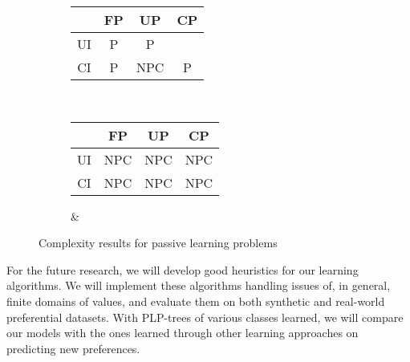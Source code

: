 \begin{figure}[!ht]
	\centering
  \begin{subfigure}[b]{0.25\textwidth}
		\centering
		\begin{tabular}[0.25\textwidth]{ | c | c | c | c | }
		  \hline
		     & FP & UP & CP \\
		  \hline
		  UI & P & P & \tit{NP}\\
		  \hline
		  CI & P & NPC & P  \\
		  \hline
		\end{tabular}
		\caption{}
		\label{fig:cons_learn}
	\end{subfigure}\\
  \begin{subfigure}[b]{0.25\textwidth}
		\centering
		\begin{tabular}[0.25\textwidth]{ | c | c | c | c | }
		  \hline
		     & FP & UP & CP \\
		  \hline
		  UI & NPC & NPC & NPC \\
		  \hline
		  CI & NPC & NPC & NPC \\
		  \hline
		\end{tabular}
		\caption{ \& }
		\label{fig:small_max_learn}
	\end{subfigure}
	\caption{Complexity results for passive learning problems}
	\label{fig:comp_results}
\end{figure}

For the future research, we will develop good heuristics for our learning algorithms.
We will implement these algorithms handling issues of, in general, finite domains
of values, and evaluate them on both synthetic and
real-world preferential datasets. 
With PLP-trees of various classes learned, we will compare our models with
the ones learned through other learning approaches on predicting new preferences.
